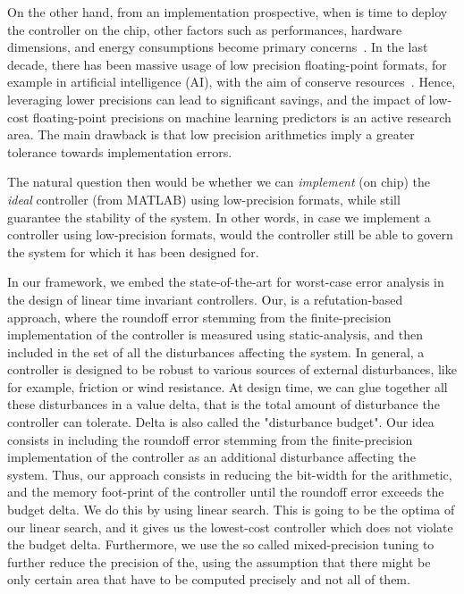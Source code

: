 %
%
On the other hand, from an implementation prospective, when is time to deploy the controller on the chip, other factors such as performances, hardware dimensions, and energy consumptions become primary concerns~\cite{suardi}.
%
In the last decade, there has been massive usage of low precision floating-point formats, for example in artificial intelligence (AI), with the aim of conserve resources~\cite{fppower}.
%
Hence, leveraging lower precisions can lead to significant savings, and the impact of low-cost floating-point precisions on machine learning predictors is an active research area.
%
The main drawback is that low precision arithmetics imply a greater tolerance towards implementation errors.
%

The natural question then would be whether we can \emph{implement} (on chip) the \emph{ideal} controller (from MATLAB) using low-precision formats, while still guarantee the stability of the system.
%
In other words, in case we implement a controller using low-precision formats, would the controller still be able to govern the system for which it has been designed for.
%

In our framework, we embed the state-of-the-art for worst-case error analysis in the design of linear time invariant controllers.
%
Our, is a refutation-based approach, where the roundoff error stemming from the finite-precision implementation of the controller is measured using static-analysis, and then included in the set of all the disturbances affecting the system.
%
In general, a controller is designed to be robust to various sources of external disturbances, like for example, friction or wind resistance.
%
At design time, we can glue together all these disturbances in a value delta, that is the total amount of disturbance the controller can tolerate.
%
Delta is also called the "disturbance budget".
%
Our idea consists in including the roundoff error stemming from the finite-precision implementation of the controller as an additional disturbance affecting the system.
%
Thus, our approach consists in reducing the bit-width for the arithmetic, and the memory foot-print of the controller until the roundoff error exceeds the budget delta.
%
We do this by using linear search.
%
This is going to be the optima of our linear search, and it gives us the lowest-cost controller which does not violate the budget delta. 
%
Furthermore, we use the so called mixed-precision tuning to further reduce the precision of the, using the assumption that there might be only certain area that have to be computed precisely and not all of them.

